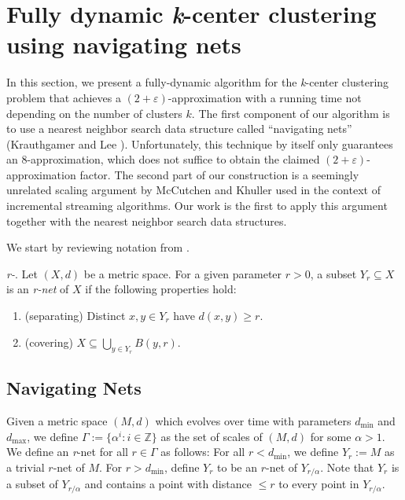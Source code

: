 \section{Fully dynamic \textit{k}-center clustering using navigating nets}


In this section, we present a fully-dynamic algorithm for the \textit{k}-center clustering problem that achieves a $(2 + \varepsilon)$-approximation with a running time not depending on the number of clusters $k$. The first component of our algorithm is to use a nearest neighbor search data structure called “navigating nets” (Krauthgamer and Lee \cite{krauthgamer2004navigating}). Unfortunately, this technique by itself only guarantees an 8-approximation, which does not suffice to obtain the claimed $(2 + \varepsilon)$-approximation factor. The second part of our construction is a seemingly unrelated scaling argument by McCutchen and Khuller \cite{mccutchen2008streaming} used in the context of incremental streaming algorithms. Our work is the first to apply this argument together with the nearest neighbor search data structures.

We start by reviewing notation from \cite{krauthgamer2004navigating}. 

\textit{r-\textbf{}}. Let $(X, d)$ be a metric space. For a given parameter $r > 0$, a subset $Y_r \subseteq X$ is an \textit{r-net} of $X$ if the following properties hold:

\begin{enumerate}
    \item (separating) Distinct $x, y \in Y_r$ have $d(x, y) \geq r$.
    \item (covering) $X \subseteq \bigcup_{y \in Y_r} B(y, r)$.
\end{enumerate}

    \subsection{Navigating Nets}  
    Given a metric space $(M, d)$ which evolves over time with parameters $d_{\text{min}}$ and $d_{\text{max}}$, we define $\Gamma := \{\alpha^i : i \in \mathbb{Z}\}$ as the set of scales of $(M, d)$ for some $\alpha > 1$. We define an \textit{r}-net for all $r \in \Gamma$ as follows: For all $r < d_{\text{min}}$, we define $Y_r := M$ as a trivial $r$-net of $M$. For $r > d_{\text{min}}$, define $Y_r$ to be an $r$-net of $Y_{r/\alpha}$. Note that $Y_r$ is a subset of $Y_{r/\alpha}$ and contains a point with distance $\leq r$ to every point in $Y_{r/\alpha}$. 
    
